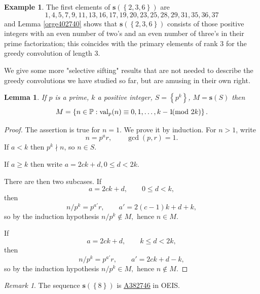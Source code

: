 \documentclass[12pt]{article}
\theoremstyle{definition}
\newtheorem{mexample}{Example}
\theoremstyle{remark}
\newtheorem{remark}{Remark}
\theoremstyle{plain}
\newtheorem{lemma}{Lemma}
\newcommand{\set}[1]{\left\{{#1}\right\}}
\newcommand\setsuchas[2]{\left\{{#1}:{#2}\right\}}
\newcommand{\NNp}{{\mathbb{P}}}
\newcommand{\val}{\operatorname{val}}
\newcommand{\dividesnot}[2]{#1 \nmid #2}
\newcommand{\ssift}[1]{\mathbf{s}({#1})}
\newcommand{\seqnum}[1]{\href{https://oeis.org/#1}{\textrm \underline{#1}}}
\begin{document}
\begin{mexample}
The first elements of \(\ssift{\set{2,3,6}}\) are
\begin{displaymath}
{1, 4, 5, 7, 9, 11, 13, 16, 17, 19, 20, 23, 25, 28, 29, 31, 35, 36, 37}
\end{displaymath}
and Lemma \ref{orge402740} shows that \(\ssift{\set{2,3,6}}\) consists of those positive integers
with an even number of two's and an even number of three's in their prime factorization;
this coincides with the primary elements of rank 3 for the greedy convolution of length 3.
\end{mexample}

We give some more "selective sifting" results that are not needed to describe the greedy convolutions
we have studied so far, but are amusing in their own right.

\begin{lemma}
If \(p\) is a prime, \(k\) a positive integer, \(S=\set{p^{k}}\), \(M=\ssift{S}\) then
\[M = \setsuchas{n \in \NNp}{\val_{p}(n) \equiv 0,1,\dots,k-1 \hspace{-2mm} \pmod{2k}} .\]
\label{org4000ed9}
\end{lemma}
\begin{proof}
The assertion is true for \(n=1\). We prove it by induction.
For  \(n>1\), write
\[n=p^{a}r, \qquad \gcd(p,r)=1.\]
If \(a < k\) then \(\dividesnot{p^{k}}{n}\), so \(n \in S\).

If \(a \ge k\) then write
\(a=2ck + d,  0 \le d < 2k\).

There are then two subcases. If
\[a=2ck + d, \qquad 0 \le d < k,\] then
\[n/p^{k} = p^{a'}r, \qquad a' = 2(c-1)k + d+k,\]
so by the induction hypothesis \(n/p^{k} \not \in M,\) hence \(n \in M\).

If
\[a=2ck + d, \qquad k \le d < 2k,\]  then
\[n/p^{k} = p^{a'}r, \qquad a' = 2ck + d-k,\]
so by the induction hypothesis \(n/p^{k}  \in M,\) hence \(n \not \in M\).
\end{proof}

\begin{remark}
The sequence \(\ssift{\set{8}}\) is \seqnum{A382746} in OEIS.
\end{remark}
\end{document}
